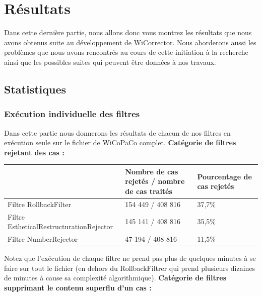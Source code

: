 \documentclass[11pt]{article}
\begin{document}
\section{R\'{e}sultats}

Dans cette derni\`{e}re partie, nous allons donc vous montrez les r\'{e}sultats que nous avons obtenus suite au d\'{e}veloppement de WiCorrector. Nous aborderons aussi les probl\`{e}mes que nous avons rencontr\'{e}s au cours de cette initiation \`{a} la recherche ainsi que les possibles suites qui peuvent \^{e}tre donn\'{e}es \`{a} nos travaux.

\subsection{Statistiques}

\subsubsection{Ex\'{e}cution individuelle des filtres}
Dans cette partie nous donnerons les r\'{e}sultats de chacun de nos filtres en ex\'{e}cution seule sur le fichier de WiCoPaCo complet.
\newline
\newline
{\bfseries Cat\'{e}gorie de filtres rejetant des cas :}

\begin{center}
\begin{tabular}{|M{4cm}|M{5cm}|M{6cm}|}
   \hline
    \, &Nombre de cas rejet\'{e}s / nombre de cas trait\'{e}s & Pourcentage de cas rejet\'{e}s \tabularnewline
   \hline
    Filtre RollbackFilter & 154 449 / 408 816 & 37,7\% \tabularnewline
   \hline
    Filtre EstheticalRestructurationRejector & 145 141 / 408 816 & 35,5\% \tabularnewline
   \hline
      Filtre NumberRejector & 47 194 / 408 816 & 11,5\% \tabularnewline
   \hline
\end{tabular}
\end{center}

Notez que l'ex\'{e}cution de chaque filtre ne prend pas plus de quelques minutes \`{a} se faire sur tout le fichier (en dehors du RollbackFiltrer qui prend plusieurs dizaines de minutes \`{a} cause sa complexit\'{e} algorithmique).
\newline
\newline
{\bfseries Cat\'{e}gorie de filtres supprimant le contenu superflu d'un cas :}
\end{document}
